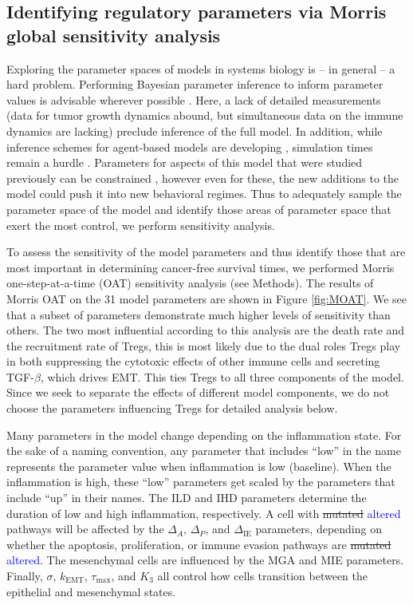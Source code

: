 \documentclass[11pt]{article}
\newcommand{\tcb} { \textcolor{blue} }
\begin{document}
\subsection{Identifying regulatory parameters via Morris global sensitivity analysis}\label{SensAnalysis}
Exploring the parameter spaces of models in systems biology is -- in general -- a hard problem. Performing Bayesian parameter inference to inform parameter values is advisable wherever possible \cite{kirk13_model}. Here, a lack of detailed measurements (data for tumor growth dynamics abound, but simultaneous data on the immune dynamics are lacking) preclude inference of the full model. In addition, while inference schemes for agent-based models are developing \cite{gallaher17_hybrid, warne19_simulation}, simulation times remain a hurdle \cite{lambert18_bayesian}. Parameters for aspects of this model that were studied previously can be constrained \cite{guo17_multiscale}, however even for these, the new additions to the model could push it into new behavioral regimes. Thus to adequately sample the parameter space of the model and identify those areas of parameter space that exert the most control, we perform sensitivity analysis.   
\par
To assess the sensitivity of the model parameters and thus identify those that are most important in determining cancer-free survival times, we performed Morris one-step-at-a-time (OAT) sensitivity analysis (see Methods). 
The results of Morris OAT on the 31 model parameters are shown in Figure \ref{fig:MOAT}. We see that a subset of parameters demonstrate much higher levels of sensitivity than others.
The two most influential according to this analysis are the death rate and the recruitment rate of Tregs, this is most likely due to the dual roles Tregs play in both suppressing the cytotoxic effects of other immune cells and secreting TGF-$\beta$, which drives EMT.
This ties Tregs to all three components of the model.
Since we seek to separate the effects of different model components, we do not choose the parameters influencing Tregs for detailed analysis below.
\par 
Many parameters in the model change depending on the inflammation state.
For the sake of a naming convention, any parameter that includes ``low'' in the name represents the parameter value when inflammation is low (baseline). When the inflammation is high, these ``low'' parameters get scaled by the parameters that include ``up'' in their names.
The ILD and IHD parameters determine the duration of low and high inflammation, respectively.
A cell with \sout{mutated} \tcb{altered} pathways will be affected by the $\Delta_A$, $\Delta_P$, and $\Delta_{\text{IE}}$ parameters, depending on whether the apoptosis, proliferation, or immune evasion pathways are \sout{mutated} \tcb{altered}.
The mesenchymal cells are influenced by the MGA and MIE parameters.
Finally, $\sigma$, $k_\text{EMT}$, $\tau_\text{max}$, and $K_3$ all control how cells transition between the epithelial and mesenchymal states.
\end{document}
